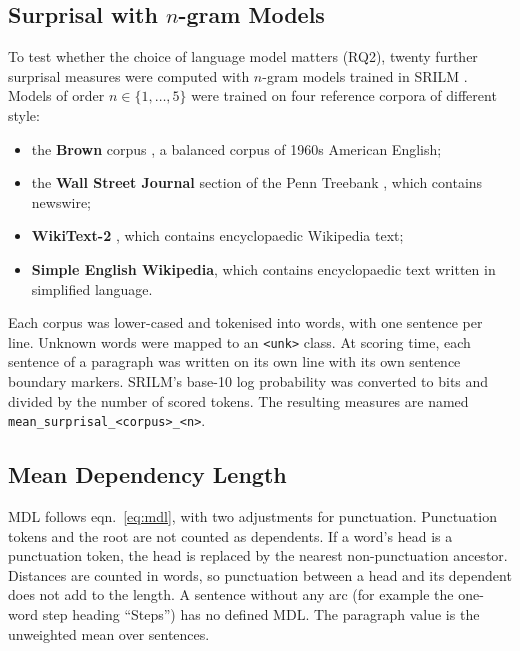 \documentclass[12pt,a4paper,oneside]{report}
\newcommand{\feat}[1]{\texttt{\detokenize{#1}}}
\begin{document}
\subsection{Surprisal with $n$-gram Models}
To test whether the choice of language model matters (RQ2), twenty further surprisal measures were computed with $n$-gram models trained in SRILM \citep{stolcke2002}. Models of order $n \in \{1,\ldots,5\}$ were trained on four reference corpora of different style:
\begin{itemize}
  \item the \textbf{Brown} corpus \citep{francis1979}, a balanced corpus of 1960s American English;
  \item the \textbf{Wall Street Journal} section of the Penn Treebank \citep{marcus1993}, which contains newswire;
  \item \textbf{WikiText-2} \citep{merity2017}, which contains encyclopaedic Wikipedia text;
  \item \textbf{Simple English Wikipedia}, which contains encyclopaedic text written in simplified language.
\end{itemize}
Each corpus was lower-cased and tokenised into words, with one sentence per line. Unknown words were mapped to an \texttt{<unk>} class. At scoring time, each sentence of a paragraph was written on its own line with its own sentence boundary markers. SRILM's base-10 log probability was converted to bits and divided by the number of scored tokens. The resulting measures are named \nolinkurl{mean_surprisal_<corpus>_<n>}.

\subsection{Mean Dependency Length}
MDL follows eqn.~\eqref{eq:mdl}, with two adjustments for punctuation. Punctuation tokens and the root are not counted as dependents. If a word's head is a punctuation token, the head is replaced by the nearest non-punctuation ancestor. Distances are counted in words, so punctuation between a head and its dependent does not add to the length. A sentence without any arc (for example the one-word step heading ``Steps'') has no defined MDL. The paragraph value \feat{mean_mdl} is the unweighted mean over sentences.
\end{document}

